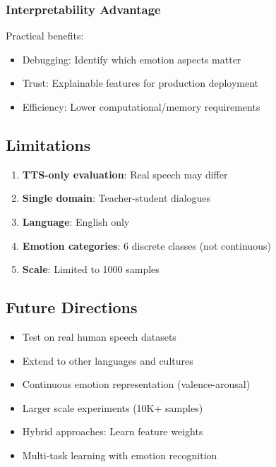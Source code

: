 \subsubsection{Interpretability Advantage}
Practical benefits:
\begin{itemize}
    \item Debugging: Identify which emotion aspects matter
    \item Trust: Explainable features for production deployment
    \item Efficiency: Lower computational/memory requirements
\end{itemize}

\subsection{Limitations}

\begin{enumerate}
    \item \textbf{TTS-only evaluation}: Real speech may differ
    \item \textbf{Single domain}: Teacher-student dialogues
    \item \textbf{Language}: English only
    \item \textbf{Emotion categories}: 6 discrete classes (not continuous)
    \item \textbf{Scale}: Limited to 1000 samples
\end{enumerate}

\subsection{Future Directions}

\begin{itemize}
    \item Test on real human speech datasets
    \item Extend to other languages and cultures
    \item Continuous emotion representation (valence-arousal)
    \item Larger scale experiments (10K+ samples)
    \item Hybrid approaches: Learn feature weights
    \item Multi-task learning with emotion recognition
\end{itemize}
